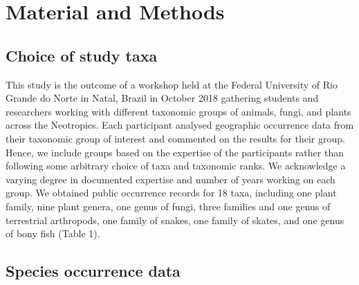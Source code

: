 \documentclass[fleqn,10pt,lineno]{wlpeerj} %
\begin{document}
\hypertarget{material-and-methods}{%
\section*{Material and Methods}\label{material-and-methods}}

\hypertarget{choice-of-study-taxa}{%
\subsection*{Choice of study taxa}\label{choice-of-study-taxa}}

This study is the outcome of a workshop held at the Federal University of Rio Grande do Norte in Natal, Brazil in October 2018 gathering students and researchers working with different taxonomic groups of animals, fungi, and plants across the Neotropics. Each participant analysed geographic occurrence data from their taxonomic group of interest and commented on the results for their group. Hence, we include groups based on the expertise of the participants rather than following some arbitrary choice of taxa and taxonomic ranks. We acknowledge a varying degree in documented expertise and number of years working on each group. We obtained public occurrence records for 18 taxa, including one plant family, nine plant genera, one genus of fungi, three families and one genus of terrestrial arthropods, one family of snakes, one family of skates, and one genus of bony fish (Table 1).

\hypertarget{species-occurrence-data}{%
\subsection*{Species occurrence data}\label{species-occurrence-data}}
\end{document}
